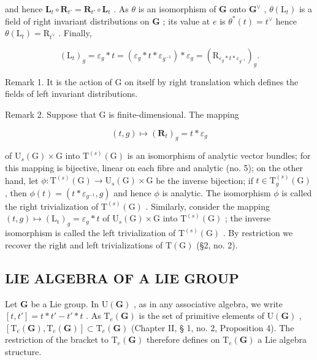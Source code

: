 and hence \(\mathbf{L}_t\circ \mathbf{R}_{t'} = \mathbf{R}_{t'}\circ \mathbf{L}_t\) . As \(\theta\) is an isomorphism of \(\mathbf{G}\) onto \(\mathbf{G}^{\vee}\) , \(\theta (\mathrm{L}_t)\) is a field of right invariant distributions on \(\mathbf{G}\) ; its value at \(e\) is \(\theta^{*}(t) = t^{\vee}\) hence \(\theta (\mathrm{L}_t) = \mathrm{R}_{t^{\vee}}\) . Finally,

\[
\left(\mathrm{L} _ {t}\right) _ {g} = \varepsilon_ {g} * t = \left(\varepsilon_ {g} * t * \varepsilon_ {g^{-1}}\right) * \varepsilon_ {g} = \left(\mathrm{R} _ {\varepsilon_ {g} * t * \varepsilon_ {g^{-1}}}\right) _ {g}.
\]

Remark 1. It is the action of G on itself by right translation which defines the fields of left invariant distributions.

Remark 2. Suppose that G is finite-dimensional. The mapping

\[
(t, g) \mapsto (\mathbf {R} _ {t}) _ {g} = t * \varepsilon_ {g}
\]

of \(\mathrm{U}_{s}(\mathrm{G})\times\mathrm{G}\) into \(\mathrm{T}^{(s)}(\mathrm{G})\) is an isomorphism of analytic vector bundles; for this mapping is bijective, linear on each fibre and analytic (no. 5); on the other hand, let \(\phi:\mathrm{T}^{(s)}(\mathrm{G})\to\mathrm{U}_{s}(\mathrm{G})\times\mathrm{G}\) be the inverse bijection; if \(t\in\mathrm{T}_{g}^{(s)}(\mathrm{G})\) , then \(\phi(t)=(t*\varepsilon_{g^{-1}},g)\) and hence \(\phi\) is analytic. The isomorphism \(\phi\) is called the right trivialization of \(\mathrm{T}^{(s)}(\mathrm{G})\) . Similarly, consider the mapping \((t,g)\mapsto(\mathrm{L}_{\mathrm{t}})_{g}=\varepsilon_{g}*t\) of \(\mathrm{U}_{s}(\mathrm{G})\times\mathrm{G}\) into \(\mathrm{T}^{(s)}(\mathrm{G})\) ; the inverse isomorphism is called the left trivialization of \(\mathrm{T}^{(s)}(\mathrm{G})\) . By restriction we recover the right and left trivializations of \(\mathrm{T}(\mathrm{G})\) (§2, no. 2).

\subsection{LIE ALGEBRA OF A LIE GROUP}

Let \(\mathbf{G}\) be a Lie group. In \(\mathrm{U}(\mathbf{G})\) , as in any associative algebra, we write \([t, t'] = t * t' - t' * t\) . As \(\mathrm{T}_{e}(\mathbf{G})\) is the set of primitive elements of \(\mathrm{U}(\mathbf{G})\) , \([\mathrm{T}_{e}(\mathbf{G}), \mathrm{T}_{e}(\mathbf{G})] \subset \mathrm{T}_{e}(\mathbf{G})\) (Chapter II, § 1, no. 2, Proposition 4). The restriction of the bracket to \(\mathrm{T}_{e}(\mathbf{G})\) therefore defines on \(\mathrm{T}_{e}(\mathbf{G})\) a Lie algebra structure.

